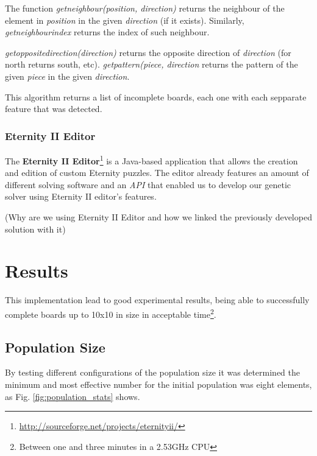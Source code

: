 \documentclass{llncs}
\begin{document}
The function \textit{getneighbour(position, direction)} returns the neighbour of the element in \textit{position} in the given \textit{direction} (if it exists). Similarly, \textit{getneighbourindex} returns the index of such neighbour.

\textit{getoppositedirection(direction)} returns the opposite direction of \textit{direction} (for north returns south, etc). \textit{getpattern(piece, direction} returns the pattern of the given \textit{piece} in the given \textit{direction}.

This algorithm returns a list of incomplete boards, each one with each sepparate feature that was detected.

\subsubsection{Eternity II Editor}\label{sec:eternity2_editor}

The \textbf{Eternity II Editor}\footnote{\url{http://sourceforge.net/projects/eternityii/}} is a Java-based application that allows the creation and edition of custom Eternity puzzles. The editor already features an amount of different solving software and an \textit{API} that enabled us to develop our genetic solver using Eternity II editor's features.


(Why are we using Eternity II Editor and how we linked the previously developed solution with it)

\section{Results}\label{sec:results}

This implementation lead to good experimental results, being able to successfully complete boards up to 10x10 in size in acceptable time\footnote{Between one and three minutes in a 2.53GHz CPU}.

\subsection{Population Size}\label{sec:population_size}

By testing different configurations of the population size it was determined the minimum and most effective number for the initial population was eight elements, as Fig. \ref{fig:population_stats} shows.
\end{document}
